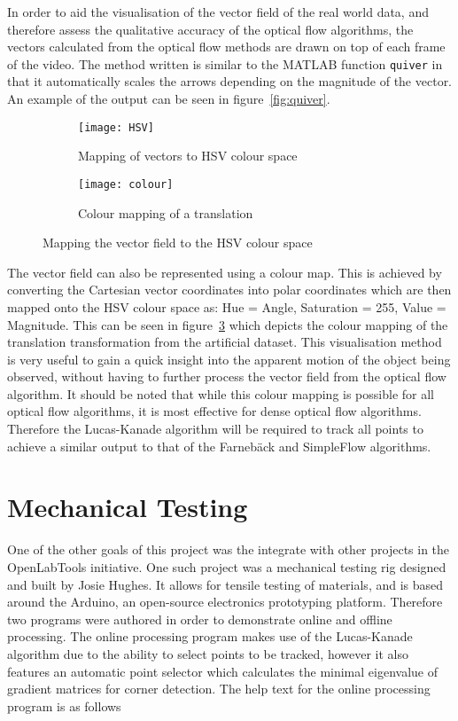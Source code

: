 In order to aid the visualisation of the vector field of the real world data, and therefore assess the qualitative accuracy of the optical flow algorithms, the vectors calculated from the optical flow methods are drawn on top of each frame of the video. The method written is similar to the MATLAB function \verb|quiver| in that it automatically scales the arrows depending on the magnitude of the vector. An example of the output can be seen in figure~\ref{fig:quiver}.

\begin{figure}[htbp!]
  \centering
  \begin{subfigure}[b]{0.45\textwidth}
    \texttt{[image: HSV]}
    \caption{Mapping of vectors to HSV colour space}
    \label{fig:hsv}
  \end{subfigure}
  \begin{subfigure}[b]{0.45\textwidth}
    \texttt{[image: colour]}
    \caption{Colour mapping of a translation}
    \label{fig:colourmap}
  \end{subfigure}
  \caption{Mapping the vector field to the HSV colour space}
  \label{fig:colour}
\end{figure}

The vector field can also be represented using a colour map. This is achieved by converting the Cartesian vector coordinates into polar coordinates which are then mapped onto the HSV colour space as: Hue = Angle, Saturation = 255, Value = Magnitude. This can be seen in figure~\ref{fig:colour} which depicts the colour mapping of the translation transformation from the artificial dataset. This visualisation method is very useful to gain a quick insight into the apparent motion of the object being observed, without having to further process the vector field from the optical flow algorithm. It should be noted that while this colour mapping is possible for all optical flow algorithms, it is most effective for dense optical flow algorithms. Therefore the Lucas-Kanade algorithm will be required to track all points to achieve a similar output to that of the Farnebäck and SimpleFlow algorithms.

\section{Mechanical Testing}

One of the other goals of this project was the integrate with other projects in the OpenLabTools initiative. One such project was a mechanical testing rig designed and built by Josie Hughes. It allows for tensile testing of materials, and is based around the Arduino, an open-source electronics prototyping platform. Therefore two programs were authored in order to demonstrate online and offline processing. The online processing program makes use of the Lucas-Kanade algorithm due to the ability to select points to be tracked, however it also features an automatic point selector which calculates the minimal eigenvalue of gradient matrices for corner detection. The help text for the online processing program is as follows

